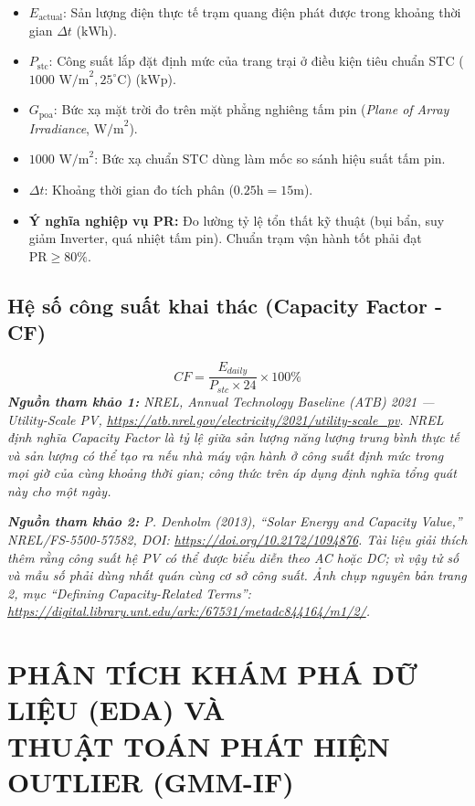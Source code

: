 \documentclass[12pt,a4paper]{article}
\begin{document}
\begin{itemize}
    \item $E_{\text{actual}}$: Sản lượng điện thực tế trạm quang điện phát được trong khoảng thời gian $\Delta t$ ($\text{kWh}$).
    \item $P_{\text{stc}}$: Công suất lắp đặt định mức của trang trại ở điều kiện tiêu chuẩn STC ($1000 \text{ W/m}^2, 25^\circ\text{C}$) ($\text{kWp}$).
    \item $G_{\text{poa}}$: Bức xạ mặt trời đo trên mặt phẳng nghiêng tấm pin (\textit{Plane of Array Irradiance}, $\text{W/m}^2$).
    \item $1000 \text{ W/m}^2$: Bức xạ chuẩn STC dùng làm mốc so sánh hiệu suất tấm pin.
    \item $\Delta t$: Khoảng thời gian đo tích phân ($0.25\text{h} = 15\text{m}$).
    \item \textbf{Ý nghĩa nghiệp vụ PR:} Đo lường tỷ lệ tổn thất kỹ thuật (bụi bẩn, suy giảm Inverter, quá nhiệt tấm pin). Chuẩn trạm vận hành tốt phải đạt $\text{PR} \ge 80\%$.
\end{itemize}

\subsection{Hệ số công suất khai thác (Capacity Factor - CF)}
\begin{equation}
    CF = \frac{E_{daily}}{P_{stc} \times 24} \times 100\%
\end{equation}
\textit{\textbf{Nguồn tham khảo 1:} NREL, \textit{Annual Technology Baseline (ATB) 2021 — Utility-Scale PV}, \url{https://atb.nrel.gov/electricity/2021/utility-scale_pv}. NREL định nghĩa Capacity Factor là tỷ lệ giữa sản lượng năng lượng trung bình thực tế và sản lượng có thể tạo ra nếu nhà máy vận hành ở công suất định mức trong mọi giờ của cùng khoảng thời gian; công thức trên áp dụng định nghĩa tổng quát này cho một ngày.}

\textit{\textbf{Nguồn tham khảo 2:} P. Denholm (2013), ``Solar Energy and Capacity Value,'' NREL/FS-5500-57582, DOI: \url{https://doi.org/10.2172/1094876}. Tài liệu giải thích thêm rằng công suất hệ PV có thể được biểu diễn theo AC hoặc DC; vì vậy tử số và mẫu số phải dùng nhất quán cùng cơ sở công suất. Ảnh chụp nguyên bản trang 2, mục ``Defining Capacity-Related Terms'': \url{https://digital.library.unt.edu/ark:/67531/metadc844164/m1/2/}.}

\section[KHÁM PHÁ DỮ LIỆU EDA \& OUTLIER GMM-IF]{PHÂN TÍCH KHÁM PHÁ DỮ LIỆU (EDA) VÀ\\THUẬT TOÁN PHÁT HIỆN OUTLIER (GMM-IF)}
\end{document}
